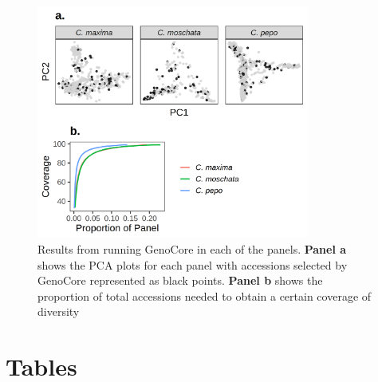 \documentclass[utf8]{FrontiersinHarvard} %
\begin{document}
\clearpage

\begin{figure}[h]
	\begin{center}
		\includegraphics[width=0.8\textwidth]{../final_figures/09_fig.png}
	\end{center}
	\caption{Results from running GenoCore in each of the panels. \textbf{Panel a} shows the PCA plots for each panel with accessions selected by GenoCore represented as black points. \textbf{Panel b} shows the proportion of total accessions needed to obtain a certain coverage of diversity \label{fig:9}}
\end{figure}




\clearpage

\section*{Tables}
\end{document}
